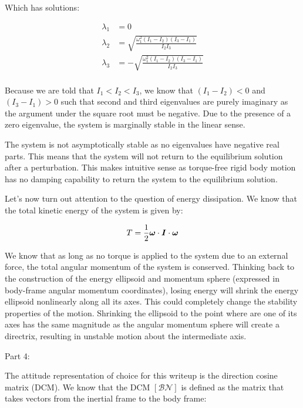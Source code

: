 Which has solutions:

\begin{align*}
    \lambda_1 &= 0 \\
    \lambda_2 &= \sqrt{\frac{\omega_1^2 \left(I_1 - I_2\right) \left(I_3 - I_1\right)}{I_2 I_3}} \\
    \lambda_3 &= -\sqrt{\frac{\omega_1^2 \left(I_1 - I_2\right) \left(I_3 - I_1\right)}{I_2 I_3}} \\
\end{align*}

Because we are told that $I_1 < I_2 < I_3$, we know that $\left(I_1 - I_2\right) < 0$ and $\left(I_3 - I_1\right) > 0$ such that second and third eigenvalues are purely imaginary as the argument under the square root must be negative. Due to the presence of a zero eigenvalue, the system is marginally stable in the linear sense. 

The system is not asymptotically stable as no eigenvalues have negative real parts. This means that the system will not return to the equilibrium solution after a perturbation. This makes intuitive sense as torque-free rigid body motion has no damping capability to return the system to the equilibrium solution.

Let's now turn out attention to the question of energy dissipation. We know that the total kinetic energy of the system is given by:

\begin{equation}
    T = \frac{1}{2} \boldsymbol{\omega} \cdot \boldsymbol{I} \cdot \boldsymbol{\omega}
\end{equation}

We know that as long as no torque is applied to the system due to an external force, the total angular momentum of the system is conserved. Thinking back to the construction of the energy ellipsoid and momentum sphere (expressed in body-frame angular momentum coordinates), losing energy will shrink the energy ellipsoid nonlinearly along all its axes. This could completely change the stability properties of the motion. Shrinking the ellipsoid to the point where are one of its axes has the same magnitude as the angular momentum sphere will create a directrix, resulting in unstable motion about the intermediate axis.

Part 4:

The attitude representation of choice for this writeup is the direction cosine matrix (DCM). We know that the DCM $\left[\mathcal{BN}\right]$ is defined as the matrix that takes vectors from the inertial frame to the body frame:

